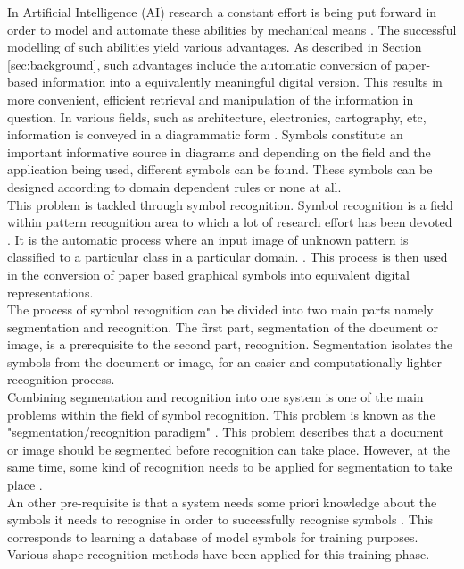 In Artificial Intelligence (AI) research a constant effort is being put forward in order to model and automate these abilities by mechanical means \cite{duin2007science}. 
The successful modelling of such abilities yield various advantages. As described in Section \ref{sec:background}, such advantages include the automatic conversion of paper-based information into a equivalently meaningful digital version. This results in more convenient, efficient retrieval and manipulation of the information in question. In various fields, such as architecture, electronics, cartography, etc, information is conveyed in a diagrammatic form \cite{Llados}. Symbols constitute an important informative source in diagrams \cite{XML} and depending on the field and the application being used, different symbols can be found.  These symbols can be designed according to domain dependent rules or none at all. \\

This problem is tackled through symbol recognition. Symbol recognition is a field within pattern recognition area to which a lot of research effort has been devoted \cite{musings}. It is the automatic process where an input image of unknown pattern is classified to a particular class in a particular domain. \cite{Llados} \cite{luqman_2009}. This process is then used in the conversion of paper based graphical symbols into equivalent digital representations.\\

The process of symbol recognition can be divided into two main parts namely segmentation and recognition. The first part, segmentation of the document or image, is a prerequisite to the second part, recognition. Segmentation isolates the symbols from the document or image, for an easier and computationally lighter recognition process.\\

Combining segmentation and recognition into one system is one of the main problems within the field of symbol recognition. This problem is known as the "segmentation/recognition paradigm" \cite{delal2}. This problem describes that a document or image should be segmented before recognition can take place. However, at the same time, some kind of recognition needs to be applied for segmentation to take place \cite{yoon2001new}. \\

An other pre-requisite is that a system needs some priori knowledge about the symbols it needs to recognise in order to successfully recognise symbols \cite{delal2}. This corresponds to learning a database of model symbols for training purposes. Various shape recognition methods have been applied for this training phase. \\

